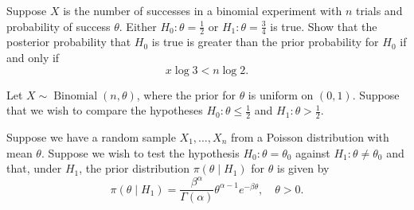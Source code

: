 \documentclass[answers]{exam}
\begin{document}
\begin{questions}
\question%
Suppose $X$ is the number of successes in a binomial experiment with $n$ trials and probability of success $\theta$. Either $H_{0}: \theta=\frac{1}{2}$ or $H_{1}: \theta=\frac{3}{4}$ is true. Show that the posterior probability that $H_{0}$ is true is greater than the prior probability for $H_{0}$ if and only if \[
	x \log 3<n \log 2.
\]



\question%
Let $X \sim \operatorname{Binomial}(n, \theta)$, where the prior for $\theta$ is uniform on $(0,1)$. Suppose that we wish to compare the hypotheses $H_{0}: \theta \leqslant \frac{1}{2}$ and $H_{1}: \theta>\frac{1}{2}$.



\question%
Suppose we have a random sample $X_{1}, \ldots, X_{n}$ from a Poisson distribution with mean $\theta$. Suppose we wish to test the hypothesis $H_{0}: \theta=\theta_{0}$ against $H_{1}: \theta \neq \theta_{0}$ and that, under $H_{1}$, the prior distribution $\pi(\theta \mid H_{1})$ for $\theta$ is given by \[
	\pi(\theta \mid H_{1})=\frac{\beta^{\alpha}}{\Gamma(\alpha)} \theta^{\alpha-1} e^{-\beta \theta}, \quad \theta>0.
\]

\end{questions}
\end{document}
